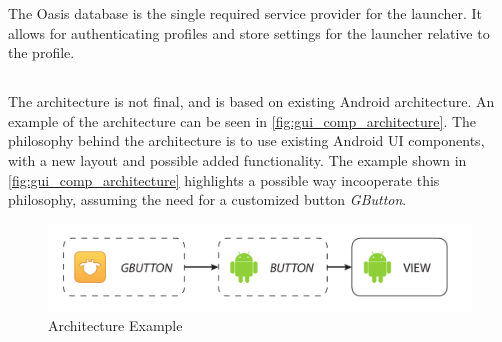 The Oasis database is the single required service provider for the launcher.
It allows for authenticating profiles and store settings for the launcher relative to the profile.

\subsection{\guicomponents[]}
The \guicomponents[] architecture is not final, and is based on existing Android architecture. An example of the architecture can be seen in \autoref{fig:gui_comp_architecture}. The philosophy behind the architecture is to use existing Android UI components, with a new layout and possible added functionality. The example shown in \autoref{fig:gui_comp_architecture} highlights a possible way incooperate this philosophy, assuming the need for a customized button \textit{GButton}. 
\begin{figure}[h]
	\centering
	\includegraphics[width=1\textwidth]{gfx/gui_components_architecture.pdf}
	\caption{\guicomponents[] Architecture Example}
	\label{fig:gui_comp_architecture}
\end{figure}

